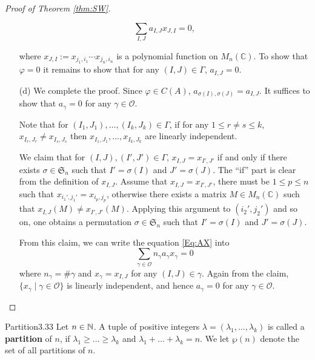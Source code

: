 \documentclass[twoside = false,	%
		headsepline,		%
		parskip = true,
		]{scrbook}						%
\begin{document}
\begin{proof}[Proof of Theorem \ref{thm:SW}]
\begin{enumerate}
            \begin{equation}\label{Eq:AX}
                \sum_{I,J}a_{I,J}x_{J,I}=0,
            \end{equation}
            
            where $x_{J,I}:=x_{j_1,i_1}\cdots x_{j_n,i_n}$ is a polynomial function on $M_n(\mathbb{C})$.
            To show that $\varphi=0$ it remains to show that for any $(I,J)\in\Gamma$, $a_{I,J}=0$.
            \item[(d)] We complete the proof. Since $\varphi\in C(A)$, $a_{\sigma(I),\sigma(J)}=a_{I,J}$. It suffices to show that $a_\gamma=0$ for any $\gamma\in\mathcal{O}$. 
            
            Note that for $(I_1,J_1),\ldots,(I_k,J_k)\in\Gamma$, if for any $1\leq r\neq s\leq k$, $x_{I_r,J_r}\neq x_{I_s,J_s}$ then $x_{I_1,J_1},\ldots,x_{I_k,J_k}$ are linearly independent.
            
            We claim that for $(I,J),(I',J')\in\Gamma$, $x_{I,J}=x_{I',J'}$ if and only if there exists $\sigma\in\mathfrak{S}_n$ such that $I'=\sigma(I)$ and $J'=\sigma(J)$. The ``if'' part is clear from the definition of $x_{I,J}$. Assume that $x_{I,J}=x_{I',J'}$, there must be $1\leq p\leq n$ such that $x_{i_1',j_1'}=x_{i_p,j_p}$, otherwise there exists a matrix $M\in M_n(\mathbb{C})$ such that  $x_{I,J}(M)\neq x_{I',J'}(M)$. Applying this argument to $(i_2',j_2')$ and so on, one obtains a permutation $\sigma\in\mathfrak{S}_n$ such that $I'=\sigma(I)$ and $J'=\sigma(J)$. 
            
            From this claim, we can write the equation \eqref{Eq:AX} into 
            $$\sum_{\gamma\in\mathcal{O}} n_\gamma a_\gamma x_\gamma=0$$
            where $n_\gamma=\#\gamma$ and $x_\gamma=x_{I,J}$ for any $(I,J)\in\gamma$. Again from the claim, $\{x_\gamma\mid\gamma\in\mathcal{O}\}$ is linearly independent, and hence $a_\gamma=0$ for any $\gamma\in\mathcal{O}$.
            \end{enumerate}
        \end{proof}

        \begin{definition}{Partition}{3.33}
            Let $n \in \mathbb N$. A tuple of positive integers $\lambda = (\lambda_1,\dots,\lambda_k)$ is called a \textbf{partition} of $n$, if $\lambda_1 \geq \dots \geq \lambda_k$ and $\lambda_1 + \dots + \lambda_k = n$. We let $\wp(n)$ denote the set of all partitions of $n$.
        \end{definition}
\end{document}
